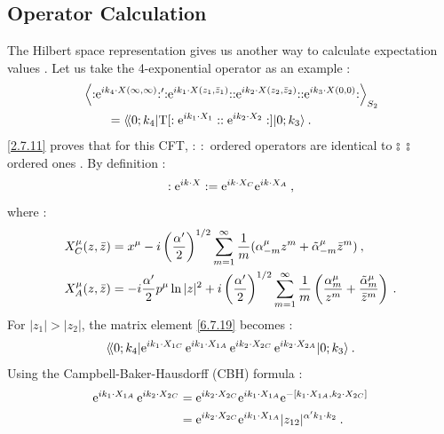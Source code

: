 \subsection*{Operator Calculation}

The Hilbert space representation gives us another way to calculate expectation values . Let us take the 4-exponential operator as an example :
\begin{align}
	&\left\langle : \mathrel{ \mathrm{e}^{i k_{4} \cdot X(\infty, \infty)} }:^{\prime} 
	:\mathrel{ \mathrm{e}^{i k_{1} \cdot X(z_{1}, \bar{z}_{1})} }: 
	:\mathrel{ \mathrm{e}^{i k_{2} \cdot X(z_{2}, \bar{z}_{2})} }: 
	:\mathrel{ \mathrm{e}^{i k_{3} \cdot X(0,0)} }: \right\rangle_{S_{2}} \nonumber \\
	&\qquad =\langle\!\langle 0 ; k_{4}|\mathrm{T}[\mathrel{  \mathrel{:} \mathrm{e}^{i k_{1} \cdot X_{1}}\mathrel{:} } \mathrel{\mathrel{:}\mathrm{e}^{i k_{2} \cdot X_{2} }  \mathrel{:}} ]| 0 ; k_{3}\rangle \:. \label{6.7.19}
\end{align}
\eqref{2.7.11} proves that for this CFT, $:\: :$ ordered operators are identical to $\typecolon\:\typecolon$ ordered ones . By definition :
\begin{equation}
	\mathrel{\mathrel{:} \mathrm{e}^{i k \cdot X } \mathrel{:} }= \mathrm{e}^{i k \cdot X_{C}} \mathrm{e}^{i k \cdot X_{A}} \:, \label{6.7.20}
\end{equation}
where :
\begin{subequations} \label{6.7.21}
	\begin{align}
		X_{C}^{\mu}(z, \bar{z}) &= x^{\mu} - i\left(\frac{\alpha^{\prime}}{2}\right)^{1 / 2} 
		\sum_{m=1}^{\infty} \frac{1}{m}(\alpha_{-m}^{\mu} z^{m}+\tilde{\alpha}_{-m}^{\mu} \bar{z}^{m}) \:, \label{6.7.21a}  \\
		X_{A}^{\mu}(z, \bar{z}) &= -i \frac{\alpha^{\prime}}{2} p^{\mu} \ln |z|^{2} + 
		i\left(\frac{\alpha^{\prime}}{2}\right)^{1 / 2} \sum_{m=1}^{\infty} 
		\frac{1}{m}\left(\frac{\alpha_{m}^{\mu}}{z^{m}}+\frac{\tilde{\alpha}_{m}^{\mu}}{\bar{z}^{m}}\right) \:. \label{6.7.21b}
	\end{align}	
\end{subequations}
For $|z_{1}|>|z_{2}|$, the matrix element \eqref{6.7.19} becomes :
\begin{equation}
	\langle\!\langle 0 ; k_{4} | \mathrm{e}^{i k_{1} \cdot X_{1 C}} \, \mathrm{e}^{i k_{1} \cdot X_{1 A}}\, \mathrm{e}^{i k_{2} \cdot X_{2 C}}\, \mathrm{e}^{i k_{2} \cdot X_{2 A}}| 0 ; k_{3} \rangle \:. \label{6.7.22}
\end{equation}
Using the Campbell-Baker-Hausdorff (CBH) formula :
\begin{align}
	\mathrm{e}^{i k_{1} \cdot X_{1 A}}\, \mathrm{e}^{i k_{2} \cdot X_{2 C}} &= 
	\mathrm{e}^{i k_{2} \cdot X_{2 C}} \mathrm{e}^{i k_{1} \cdot X_{1 A}} \mathrm{e}^{-[k_{1} \cdot X_{1 A}, k_{2} \cdot X_{2 C}]}  \nonumber \\
	&=\mathrm{e}^{i k_{2} \cdot X_{2 C}} \mathrm{e}^{i k_{1} \cdot X_{1 A}} |z_{12}|^{\alpha^{\prime} k_{1} \cdot k_{2}} \:. \label{6.7.23}
\end{align}
